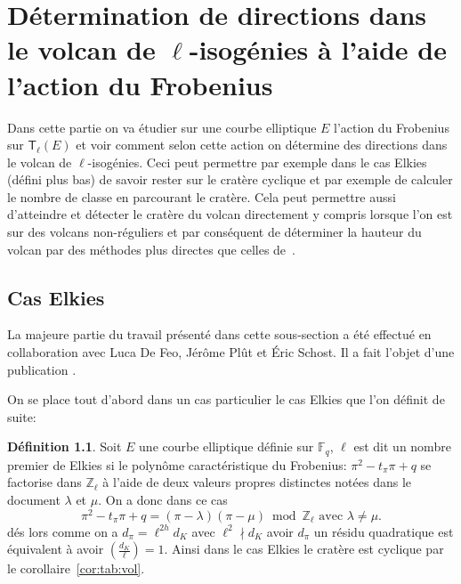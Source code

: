 \documentclass[10pt,a4paper]{book}
\theoremstyle{plain}
\theoremstyle{definition}
\theoremstyle{definition}
\theoremstyle{definition}
\theoremstyle{definition}
\newtheorem{defi}[thm]{Définition}
\theoremstyle{remark}
\theoremstyle{remark}
\theoremstyle{definition}
\begin{document}
\chapter{Détermination de directions dans le volcan de $\ell$-isogénies à l'aide de l'action du Frobenius}
Dans cette partie on va étudier sur une courbe elliptique $E$ l'action du 
Frobenius sur $\mathsf{T}_{\ell}(E)$ et voir comment selon cette action on 
détermine des directions dans le volcan de $\ell$-isogénies.  Ceci peut permettre par exemple dans le cas Elkies (défini 
plus bas) de savoir rester sur le cratère cyclique et par exemple de calculer
le nombre de classe en parcourant le cratère. Cela peut permettre aussi d'atteindre et 
détecter le cratère du volcan directement y compris lorsque l'on est sur des 
volcans non-réguliers et par conséquent de déterminer la hauteur du volcan par
des méthodes plus directes que celles de~\cite{FouquetMorain02}.

\section{Cas Elkies}

\label{cha:act:fro}


La majeure partie du travail présenté dans cette sous-section a été effectué en collaboration avec Luca De Feo, Jér\^ome Pl\^ut et \'Eric Schost. Il a fait l'objet d'une publication \cite{Defeo_Plut_Schost_2016}.

 On se place tout d'abord dans un cas particulier le cas Elkies que l'on définit de suite: 
\begin{defi}
\label{def:cas:elk}
Soit $E$ une courbe elliptique définie sur $\mathbb{F}_q$, $\ell$ est dit un nombre premier de Elkies si le polynôme caractéristique du Frobenius: $\pi^2-t_{\pi}\pi + q$ se factorise dans $\mathbb{Z}_{\ell}$ à l'aide de deux valeurs propres distinctes notées dans le document $\lambda$ et $\mu$. On a donc dans ce cas
\begin{equation*}
\pi^2 - t_{\pi}\pi + q = (\pi - \lambda)(\pi - \mu) \bmod \mathbb{Z}_{\ell} \text{ avec } \lambda \neq \mu.
\end{equation*}
dés lors comme on a $d_{\pi}=\ell^{2h}d_{K}$ avec $\ell^2 \nmid d_{K}$ avoir 
$d_{\pi}$ un résidu quadratique est équivalent à avoir $\left( 
\frac{d_{K}}{\ell} \right)=1$. Ainsi dans le cas Elkies le cratère est cyclique
par le corollaire~\ref{cor:tab:vol}.
\end{defi}
\end{document}
